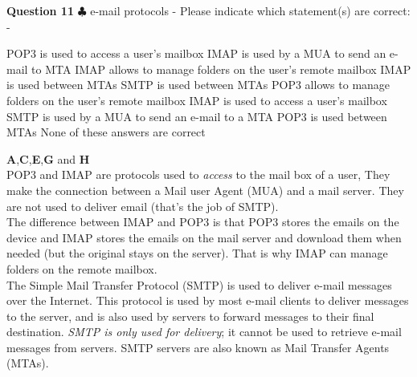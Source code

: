 \documentclass[en]{sourcefiles/eplexam}
\newcounter{choice}
\renewcommand\thechoice{\textbf{\Alph{choice}}}
\newcommand\choicelabel{\thechoice$\quad$}
\newenvironment{choices}%
  {\list{\choicelabel}%
     {\usecounter{choice}\def\makelabel##1{\hss\llap{##1}}%
       \settowidth{\leftmargin}{W.\hskip\labelsep\hskip 2.5em}%
       \def\choice{%
         \item
       } %
       \labelwidth\leftmargin\advance\labelwidth-\labelsep
       \topsep=0pt
       \partopsep=0pt
     }%
  }%
  {\endlist}
\begin{document}
\textbf{Question 11} $\clubsuit$ e-mail protocols - Please indicate which statement(s) are correct:
\begin{choices}
     \choice POP3 is used to access a user's mailbox
     \choice IMAP is used by a MUA to send an e-mail to MTA
    \choice IMAP allows to manage folders on the user's remote mailbox
    \choice IMAP is used between MTAs
    \choice SMTP is used between MTAs
    \choice POP3 allows to manage folders on the user's remote mailbox
    \choice IMAP is used to access a user's mailbox
    \choice SMTP is used by a MUA to send an e-mail to a MTA
    \choice POP3 is used between MTAs
    \choice None of these answers are correct
\end{choices}
\begin{solution}
\textbf{A},\textbf{C},\textbf{E},\textbf{G} and \textbf{H}\\
\newline
POP3 and IMAP are protocols used to \textit{access} to the mail box of a user, They make the connection between a Mail user Agent (MUA) and a mail server. They are not used to deliver email (that's the job of SMTP).\\

\noindent The difference between IMAP and POP3 is that POP3 stores the emails on the device and IMAP stores the emails on the mail server and download them when needed (but the original stays on the server). That is why IMAP can manage folders on the remote mailbox.\\

\noindent The Simple Mail Transfer Protocol (SMTP) is used to deliver e-mail messages over the Internet. This protocol is used by most e-mail clients to deliver messages to the server, and is also used by servers to forward messages to their final destination. \textit{SMTP is only used for delivery}; it cannot be used to retrieve e-mail messages from servers. SMTP servers are also known as Mail Transfer Agents (MTAs).

\end{solution}
\end{document}
